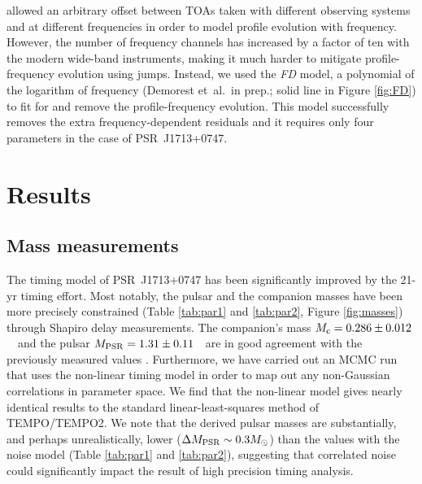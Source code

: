 \citet{dfg+13} allowed an arbitrary offset between TOAs taken with different
observing systems and at different frequencies in order to model profile
evolution with frequency.
However, the number of frequency
channels has increased by a factor of ten with the modern wide-band
instruments, making it much harder to mitigate profile-frequency evolution using jumps. 
Instead, we used the {\it FD} model, a polynomial of the logarithm of
frequency (Demorest et~al.\ in prep.; solid line in Figure
\ref{fig:FD}) to fit for and remove the profile-frequency
evolution. This model successfully removes the extra
frequency-dependent residuals and it requires only four parameters in the
case of PSR~J1713+0747.


\section{Results}
\label{sec:res}

\subsection{Mass measurements}
\label{sec:mass}
The timing model of PSR~J1713+0747 has been significantly improved by the 21-yr timing effort.
Most notably, the pulsar and the companion masses have been more precisely
constrained (Table \ref{tab:par1} and \ref{tab:par2}, Figure \ref{fig:masses}) through Shapiro delay measurements. The
companion's mass $M_{\rm c} = 0.286\pm0.012$~\Msun\, and the pulsar $M_{\rm
PSR}=1.31\pm0.11$~\Msun\, are in good agreement with the previously measured
values \citep{sns+05}. Furthermore, we have carried out an MCMC run that uses the non-linear timing
model in order to map out any non-Gaussian correlations in parameter space. We find that the non-linear
model gives nearly identical results to the standard linear-least-squares
method of \textsc{TEMPO}/\textsc{TEMPO2}.
We note that the derived pulsar masses are substantially, and perhaps
unrealistically, lower ($\Delta M_{\rm PSR} \sim 0.3 M_{\odot}$) than the
values with the noise model (Table \ref{tab:par1} and \ref{tab:par2}), suggesting that
correlated noise could significantly impact the result of high
precision timing analysis.

